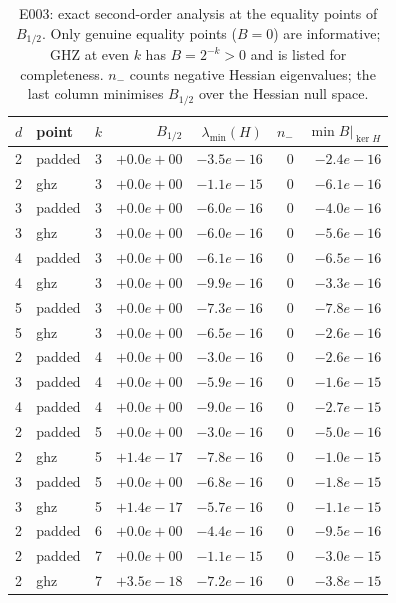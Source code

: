 \begin{table}[h]\centering
\caption{E003: exact second-order analysis at the equality points of $B_{1/2}$. Only genuine equality points ($B=0$) are informative; GHZ at even $k$ has $B=2^{-k}>0$ and is listed for completeness. $n_-$ counts negative Hessian eigenvalues; the last column minimises $B_{1/2}$ over the Hessian null space.}\label{tab:hess}
{\setlength{\tabcolsep}{8pt}\renewcommand{\arraystretch}{1.2}
\begin{tabular}{llrrrrr}\toprule
$d$ & point & $k$ & $B_{1/2}$ & $\lambda_{\min}(H)$ & $n_-$ & $\min B|_{\ker H}$ \\\midrule
2 & padded & 3 & $+0.0e+00$ & $-3.5e-16$ & 0 & $-2.4e-16$ \\
2 & ghz & 3 & $+0.0e+00$ & $-1.1e-15$ & 0 & $-6.1e-16$ \\
3 & padded & 3 & $+0.0e+00$ & $-6.0e-16$ & 0 & $-4.0e-16$ \\
3 & ghz & 3 & $+0.0e+00$ & $-6.0e-16$ & 0 & $-5.6e-16$ \\
4 & padded & 3 & $+0.0e+00$ & $-6.1e-16$ & 0 & $-6.5e-16$ \\
4 & ghz & 3 & $+0.0e+00$ & $-9.9e-16$ & 0 & $-3.3e-16$ \\
5 & padded & 3 & $+0.0e+00$ & $-7.3e-16$ & 0 & $-7.8e-16$ \\
5 & ghz & 3 & $+0.0e+00$ & $-6.5e-16$ & 0 & $-2.6e-16$ \\
2 & padded & 4 & $+0.0e+00$ & $-3.0e-16$ & 0 & $-2.6e-16$ \\
3 & padded & 4 & $+0.0e+00$ & $-5.9e-16$ & 0 & $-1.6e-15$ \\
4 & padded & 4 & $+0.0e+00$ & $-9.0e-16$ & 0 & $-2.7e-15$ \\
2 & padded & 5 & $+0.0e+00$ & $-3.0e-16$ & 0 & $-5.0e-16$ \\
2 & ghz & 5 & $+1.4e-17$ & $-7.8e-16$ & 0 & $-1.0e-15$ \\
3 & padded & 5 & $+0.0e+00$ & $-6.8e-16$ & 0 & $-1.8e-15$ \\
3 & ghz & 5 & $+1.4e-17$ & $-5.7e-16$ & 0 & $-1.1e-15$ \\
2 & padded & 6 & $+0.0e+00$ & $-4.4e-16$ & 0 & $-9.5e-16$ \\
2 & padded & 7 & $+0.0e+00$ & $-1.1e-15$ & 0 & $-3.0e-15$ \\
2 & ghz & 7 & $+3.5e-18$ & $-7.2e-16$ & 0 & $-3.8e-15$ \\
\bottomrule\end{tabular}}
\end{table}


